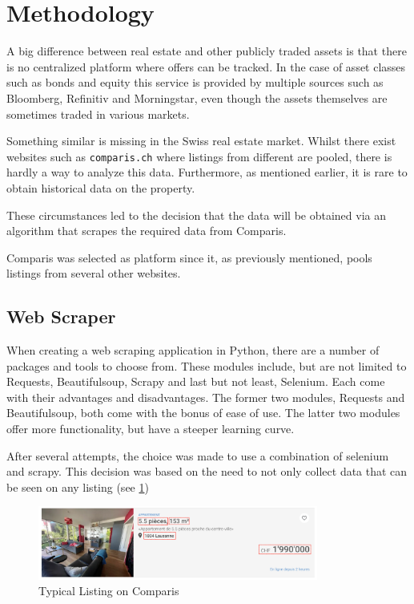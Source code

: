 \documentclass[main]{subfiles}
\begin{document}
\section{Methodology}
A big difference between real estate and other publicly traded assets is that there is no centralized platform where offers can be tracked. 
In the case of asset classes such as bonds and equity this service is provided by multiple sources
such as Bloomberg, Refinitiv and Morningstar, even though the assets themselves are sometimes traded in various markets.

Something similar is missing in the Swiss real estate market. 
Whilst there exist websites such as \verb|comparis.ch| where listings from different are pooled, there is hardly a way to analyze this data.
Furthermore, as mentioned earlier, it is rare to obtain historical data on the property.

These circumstances led to the decision that the data will be obtained via an algorithm that scrapes the required data
from Comparis. 

Comparis was selected as platform since it, as previously mentioned, pools listings from several other websites.


\subsection{Web Scraper}

When creating a web scraping application in Python, there are a number of packages and tools to choose from.
These modules include, but are not limited to Requests, Beautifulsoup, Scrapy and last but not least, Selenium.
Each come with their advantages and disadvantages. 
The former two modules, Requests and Beautifulsoup, both come with the bonus of ease of use.
The latter two modules offer more functionality, but have a steeper learning curve.

After several attempts, the choice was made to use a combination of selenium and scrapy.
This decision was based on the need to not only collect data that can be seen on any listing (see \ref{fig:listing}) 
\begin{figure}[htbp]
    \centerline{
        \includegraphics[width = 92mm]{prog_1.png}}
    \caption{Typical Listing on Comparis}
    \label{fig:listing}
\end{figure}
\end{document}
